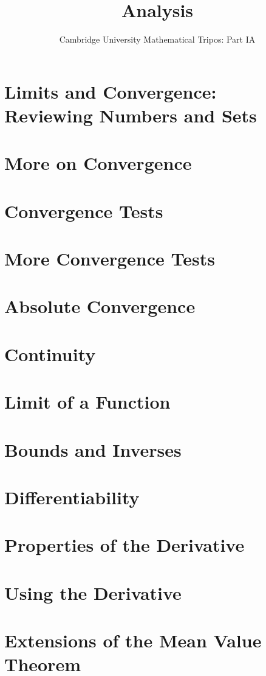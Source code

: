 \documentclass{article}
\title{Analysis}
\author{Cambridge University Mathematical Tripos: Part IA}
\begin{document}
\maketitle

\tableofcontentsnewpage{}

\section{Limits and Convergence: Reviewing Numbers and Sets}

\section{More on Convergence}

\section{Convergence Tests}

\section{More Convergence Tests}

\section{Absolute Convergence}

\section{Continuity}

\section{Limit of a Function}

\section{Bounds and Inverses}

\section{Differentiability}

\section{Properties of the Derivative}

\section{Using the Derivative}

\section{Extensions of the Mean Value Theorem}

\end{document}
